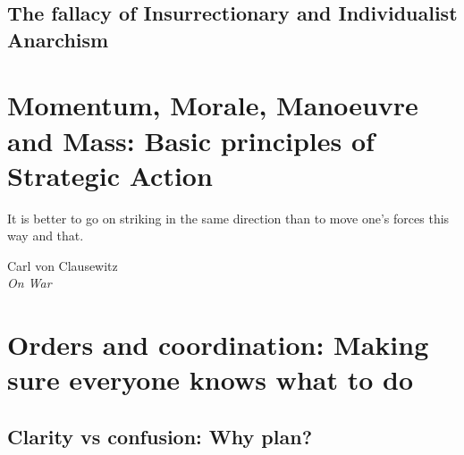 \documentclass[11pt,fleqn]{memoir} %
\begin{document}
    \section{The fallacy of Insurrectionary and Individualist Anarchism}

  \chapter{Momentum, Morale, Manoeuvre and Mass: Basic principles of Strategic Action}
    \epigraph{It is better to go on striking in the same direction than to move one's forces this way and that.}{Carl von Clausewitz\\ \textit{On War}}
    

  
        
        
  

        
  \chapter{Orders and coordination: Making sure everyone knows what to do}
    \section{Clarity vs confusion: Why plan?}
\end{document}
